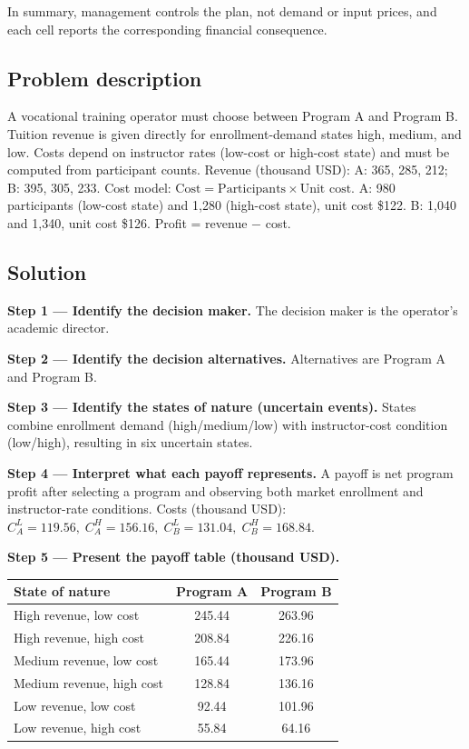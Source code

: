 \begin{ExamProblems}
		In summary, management controls the plan, not demand or input prices, and each cell reports the corresponding financial consequence.
		
		\item
		\subsection*{Problem description}
		A vocational training operator must choose between Program A and Program B.
		Tuition revenue is given directly for enrollment-demand states high, medium, and low.
		Costs depend on instructor rates (low-cost or high-cost state) and must be computed from participant counts.
		Revenue (thousand USD):
		A: 365, 285, 212;
		B: 395, 305, 233.
		Cost model: \(\text{Cost}=\text{Participants}\times\text{Unit cost}\).
		A: 980 participants (low-cost state) and 1{,}280 (high-cost state), unit cost \$122.
		B: 1{,}040 and 1{,}340, unit cost \$126.
		Profit = revenue $-$ cost.
		
		\subsection*{Solution}
		\textbf{Step 1 --- Identify the decision maker.} The decision maker is the operator's academic director.
		
		\textbf{Step 2 --- Identify the decision alternatives.} Alternatives are Program A and Program B.
		
		\textbf{Step 3 --- Identify the states of nature (uncertain events).} States combine enrollment demand (high/medium/low) with instructor-cost condition (low/high), resulting in six uncertain states.
		
		\textbf{Step 4 --- Interpret what each payoff represents.} A payoff is net program profit after selecting a program and observing both market enrollment and instructor-rate conditions. Costs (thousand USD):
		\(C_A^L=119.56,\;C_A^H=156.16,\;C_B^L=131.04,\;C_B^H=168.84\).
		
		\textbf{Step 5 --- Present the payoff table (thousand USD).}
		\begin{center}
			\begin{tabular}{l c c}
				\toprule
				State of nature & Program A & Program B \\
				\midrule
				High revenue, low cost & 245.44 & 263.96 \\
				High revenue, high cost & 208.84 & 226.16 \\
				Medium revenue, low cost & 165.44 & 173.96 \\
				Medium revenue, high cost & 128.84 & 136.16 \\
				Low revenue, low cost & 92.44 & 101.96 \\
				Low revenue, high cost & 55.84 & 64.16 \\
				\bottomrule
			\end{tabular}
		\end{center}
		

\end{ExamProblems}
